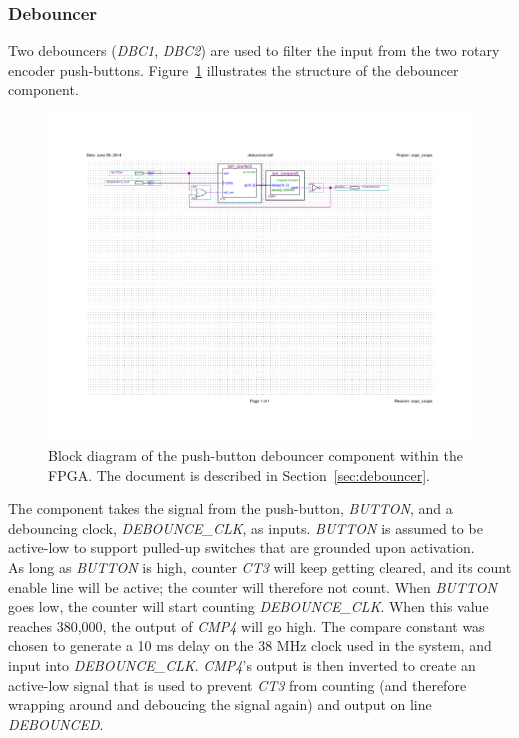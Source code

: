 \documentclass[titlepage]{scrartcl}
\begin{document}
	\clearpage

	\subsubsection{Debouncer \label{sec:debouncer}}
	Two debouncers (\textit{DBC1}, \textit{DBC2}) are used to filter the input from the two rotary encoder push-buttons. Figure~\ref{fig:debouncer_bdf} illustrates the structure of the debouncer component.\\

	\begin{figure}[h!]
	\vspace{-4cm}
	\centerline{\includegraphics[width=30cm, angle=90, origin=c]{img/debouncer.pdf}}
		\vspace{-2cm}
                	\caption{Block diagram of the push-button debouncer component within the FPGA. The document is described in Section~\ref{sec:debouncer}.}
               	\label{fig:debouncer_bdf}
	\end{figure}

	The component takes the signal from the push-button, \textit{BUTTON}, and a debouncing clock, \textit{DEBOUNCE\_CLK}, as inputs. \textit{BUTTON} is assumed to be active-low to support pulled-up switches that are grounded upon activation.\\

	As long as \textit{BUTTON} is high, counter \textit{CT3} will keep getting cleared, and its count enable line will be active; the counter will therefore not count. When \textit{BUTTON} goes low, the counter will start counting \textit{DEBOUNCE\_CLK}. When this value reaches 380,000, the output of \textit{CMP4} will go high. The compare constant was chosen to generate a 10 ms delay on the 38 MHz clock used in the system, and input into \textit{DEBOUNCE\_CLK}. \textit{CMP4}'s output is then inverted to create an active-low signal that is used to prevent \textit{CT3} from counting (and therefore wrapping around and deboucing the signal again) and output on line \textit{DEBOUNCED}.
\end{document}
